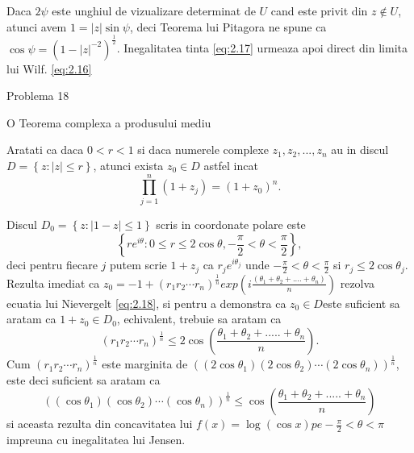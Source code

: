 \documentclass[a4paper,12pt,oneside]{report}
\begin{document}
Daca \(2\psi\) este unghiul de vizualizare determinat de \(U\) cand este privit din \(z \notin U\), atunci avem \(1 = \left | z \right |\sin\psi\), deci Teorema lui Pitagora ne spune ca \(\cos\psi = \left ( 1 - \left | z \right |^{-2} \right )^{\frac{1}{2}}\). Inegalitatea tinta \ref{eq:2.17} urmeaza apoi direct din limita lui Wilf. \ref{eq:2.16}

Problema 18

O Teorema complexa a produsului mediu 

Aratati ca daca \(0 < r < 1\) si daca numerele complexe \(z_{1}, z_{2},...,z_{n}\) au in discul \(D = \left \{ z: \left | z \right | \leq r\right \}\), atunci exista \(z_{0} \in D\) astfel incat 
\begin{displaymath}
    \prod_{j = 1}^{n}\left ( 1 + z_{j} \right ) = \left ( 1 + z_{0} \right )^{n}.\label{eq:2.18} \tag{2.18}
\end{displaymath}

Discul \(D_{0} = \left \{ z : \left | 1 - z \right |\leq 1 \right \}\) scris in coordonate polare este 
\begin{displaymath}
    \left \{ re^{i\theta } : 0 \leq r\leq 2\cos\theta , -\frac{\pi }{2}< \theta  < \frac{\pi }{2} \right \},
\end{displaymath}
deci pentru fiecare \(j\) putem scrie \(1 + z_{j}\) ca \(r_{j}e^{i\theta _{j}}\) unde \(-\frac{\pi }{2}< \theta  < \frac{\pi }{2}\) si \( r_{j}\leq 2\cos\theta _{j}\). Rezulta imediat ca \(z_{0} = -1 + \left ( r_{1} r_{2}\cdots r_{n}\right )^{\frac{1}{n}}exp\left ( i\frac{\left ( \theta _{1} + \theta _{2} +....+ \theta _{n} \right )}{n} \right )\) rezolva ecuatia lui Nievergelt \ref{eq:2.18}, si pentru a demonstra ca \(z_{0}\in D \)este suficient sa aratam ca \(1 + z_{0}\in D_{0}\), echivalent, trebuie sa aratam ca 
\begin{displaymath}
    \left ( r_{1} r_{2} \cdots r_{n}\right )^{\frac{1}{n}}\leq 2\cos\left ( \frac{\theta _{1} + \theta _{2}+.....+\theta _{n}}{n} \right ) \label{eq:2.19} \tag{2.19}. 
\end{displaymath}
Cum \(\left ( r_{1} r_{2} \cdots r_{n}\right )^{\frac{1}{n}}\) este marginita de \(\left ( \left (2\cos\theta _{1}  \right )\left ( 2\cos\theta _{2} \right )\cdots \left (2\cos\theta _{n}  \right ) \right )^{\frac{1}{n}}\), este deci suficient sa aratam ca 
\begin{displaymath}
    \left ( \left (\cos\theta _{1}  \right )\left ( \cos\theta _{2} \right )\cdots \left (\cos\theta _{n}  \right ) \right )^{\frac{1}{n}}\leq \cos\left ( \frac{\theta _{1} + \theta _{2}+.....+\theta _{n}}{n} \right )
\end{displaymath}
si aceasta rezulta din concavitatea lui \(f\left ( x \right ) = \log \left ( \cos x \right ) pe -\frac{\pi }{2}< \theta < \pi\) impreuna cu inegalitatea lui Jensen. 
\end{document}
